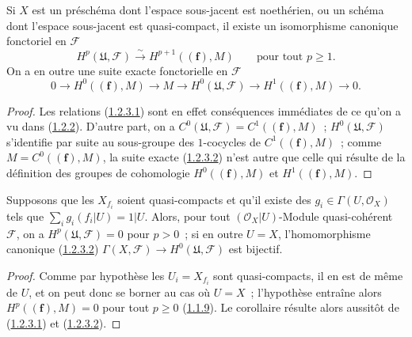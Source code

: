 \begin{proposition}[1.2.3]
\label{III.1.2.3-fr}
Si $X$ est un préschéma dont l'espace sous-jacent est noethérien, ou un
schéma dont l'espace sous-jacent est quasi-compact, il existe un isomorphisme
canonique fonctoriel en $\mathcal F$
\begin{equation}
\label{III.1.2.3.1-fr}
\tag{1.2.3.1}
H^p(\mathfrak U,\mathcal F)\xrightarrow{\sim}H^{p+1}((\mathbf f),M)
\qquad\text{pour tout }p\geq1.
\end{equation}
On a en outre une suite exacte fonctorielle en $\mathcal F$
\begin{equation}
\label{III.1.2.3.2-fr}
\tag{1.2.3.2}
0\longrightarrow H^0((\mathbf f),M)\longrightarrow M
\longrightarrow H^0(\mathfrak U,\mathcal F)
\longrightarrow H^1((\mathbf f),M)\longrightarrow0.
\end{equation}
\end{proposition}

\begin{proof}
Les relations (\hyperref[III.1.2.3.1-fr]{1.2.3.1}) sont en effet conséquences
immédiates de ce qu'on a vu dans (\hyperref[III.1.2.2-fr]{1.2.2}). D'autre
part, on a
$C^0(\mathfrak U,\mathcal F)=C^1((\mathbf f),M)$~;
$H^0(\mathfrak U,\mathcal F)$ s'identifie par suite au sous-groupe des
$1$-cocycles de $C^1((\mathbf f),M)$~; comme
$M=C^0((\mathbf f),M)$, la suite exacte
(\hyperref[III.1.2.3.2-fr]{1.2.3.2}) n'est autre que celle qui résulte de la
définition des groupes de cohomologie $H^0((\mathbf f),M)$ et
$H^1((\mathbf f),M)$.
\end{proof}

\begin{corollary}[1.2.4]
\label{III.1.2.4-fr}
Supposons que les $X_{f_i}$ soient quasi-compacts et qu'il existe des
$g_i\in\Gamma(U,\mathcal O_X)$ tels que
$\sum_i g_i(f_i\vert U)=1\vert U$. Alors, pour tout
$(\mathcal O_X\vert U)$-Module quasi-cohérent $\mathcal F$, on a
$H^p(\mathfrak U,\mathcal F)=0$ pour $p>0$~; si en outre $U=X$,
l'homomorphisme canonique \textup{(\hyperref[III.1.2.3.2-fr]{1.2.3.2})}
$\Gamma(X,\mathcal F)\to H^0(\mathfrak U,\mathcal F)$ est bijectif.
\end{corollary}

\begin{proof}
Comme par hypothèse les $U_i=X_{f_i}$ sont quasi-compacts, il en est de même
de $U$, et on peut donc se borner au cas où $U=X$~; l'hypothèse entraîne alors
$H^p((\mathbf f),M)=0$ pour tout $p\geq0$
(\hyperref[III.1.1.9-fr]{1.1.9}). Le corollaire résulte alors aussitôt de
(\hyperref[III.1.2.3.1-fr]{1.2.3.1}) et
(\hyperref[III.1.2.3.2-fr]{1.2.3.2}).
\end{proof}

